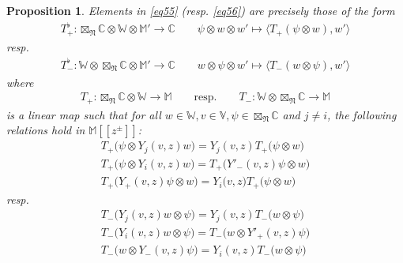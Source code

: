 \documentclass[11pt,b5paper,notitlepage]{article}
\theoremstyle{definition}
\theoremstyle{plain}
\newtheorem{pp}[df]{Proposition}
\newcommand{\Vbb}{\mathbb V}
\newcommand{\Wbb}{\mathbb W}
\newcommand{\Mbb}{\mathbb M}
\newcommand{\Cbb}{\mathbb C}
\newcommand{\<}{\left\langle}
\renewcommand{\>}{\right\rangle}
\newcommand{\bk}[1]{\langle {#1}\rangle}
\newcommand{\fn}{\mathfrak{N}}
\numberwithin{equation}{section}
\begin{document}
\begin{pp}\label{lb44}
Elements in \eqref{eq55} (resp. \eqref{eq56}) are precisely those of the form
\begin{gather*}
T_+^\flat:\boxtimes_\fn\Cbb\otimes\Wbb\otimes\Mbb'\rightarrow\Cbb\qquad \psi\otimes w\otimes w'\mapsto\bk{T_+(\psi\otimes w),w'}
\end{gather*}
resp.
\begin{gather*}
T_-^\flat:\Wbb\otimes\boxtimes_\fn\Cbb\otimes\Mbb'\rightarrow\Cbb\qquad w\otimes\psi\otimes w'\mapsto\bk{T_-(w\otimes\psi),w'}
\end{gather*}
where
\begin{align*}
T_+:\boxtimes_\fn\Cbb\otimes\Wbb\rightarrow\Mbb\qquad\text{resp.}\qquad T_-:\Wbb\otimes\boxtimes_\fn\Cbb\rightarrow\Mbb
\end{align*}
is a linear map such that for all $w\in\Wbb,v\in\Vbb,\psi\in\boxtimes_\fn\Cbb$ and $j\neq i$, the following relations hold in $\Mbb[[z^{\pm}]]$:
\begin{subequations}\label{eq118}
\begin{gather}
T_+\big(\psi\otimes Y_j(v,z)w\big)=Y_j(v,z)T_+\big(\psi\otimes w\big)\\
T_+\big(\psi\otimes Y_i(v,z)w\big)=T_+\big(Y'_-(v,z)\psi\otimes w\big)\\
T_+\big(Y_+(v,z)\psi\otimes w\big)=Y_i\big(v,z)T_+(\psi\otimes w\big)\label{eq118c}
\end{gather}
\end{subequations}
resp.
\begin{subequations}\label{eq119}
\begin{gather}
T_-\big(Y_j(v,z)w\otimes \psi\big)=Y_j(v,z)T_-\big(w\otimes\psi\big)\\
T_-\big(Y_i(v,z)w\otimes\psi\big)=T_-\big(w\otimes Y'_+(v,z)\psi\big)\\
T_-\big(w\otimes Y_-(v,z)\psi\big)=Y_i(v,z)T_-\big(w\otimes\psi\big)
\end{gather}
\end{subequations}
\end{pp}
\end{document}
